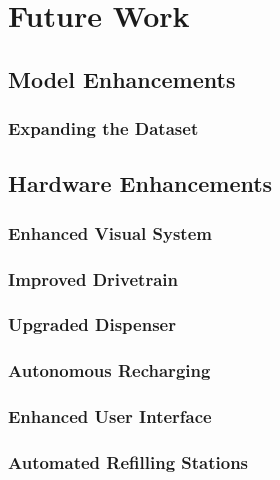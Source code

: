 \chapter{Future Work}
\label{chap:future_work}

\section{Model Enhancements}
\subsection{Expanding the Dataset} 

\section{Hardware Enhancements}
\subsection{Enhanced Visual System}
\subsection{Improved Drivetrain}
\subsection{Upgraded Dispenser}
\subsection{Autonomous Recharging}
\subsection{Enhanced User Interface}
\subsection{Automated Refilling Stations}
